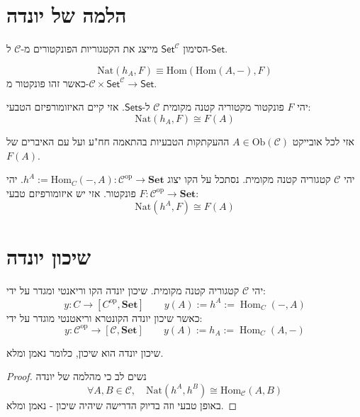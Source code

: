 \documentclass{tstextbook}
\begin{document}
\section{הלמה של יונדה}

\begin{reminder}
הסימון \(\mathsf{Set}^{\mathcal{C}}\) מייצג את הקטגוריות הפונקטורים מ-\(\mathcal{C}\) ל-\(\mathsf{Set}\).

\end{reminder}
\begin{definition}
$$\mathrm{{Nat}}(h_{A},F)\equiv\mathrm{{Hom}}(\mathrm{{Hom}}(A,-),F)$$
כאשר זהו פונקטור מ-\(\mathcal{C}\times \mathsf{Set}^{\mathcal{C}}\to\mathsf{Set}\).

\end{definition}
\begin{proposition}
יהי \(F\) פונקטור מקטוריה קטנה מקומית \(\mathcal{C}\) ל-\(\mathsf{Sets}\). אזי קיים האיזומורפיזם הטבעי:
$$\mathrm{Nat}(h_{A},F)\cong F(A)$$

\end{proposition}
אזי לכל אובייקט \(A \in \mathrm{Ob}\left( \mathcal{C} \right)\) ההעקתקות הטבעיות  בהתאמה חח"ע ועל עם האיברים של \(F(A)\).

\begin{proposition}
יהי \(\mathcal{C}\) קטגוריה קטנה מקומית. נסתכל על הקו יצוג \(h^{A}:=\mathrm{Hom}_{C}(-,A):{\mathcal C}^{\mathrm{op}}\to\mathbf{Set}\). יהי \(F: \mathcal{C}^{\mathrm{op}} \to \mathbf{Set}\) פונקטור. אזי יש איזומורפיזם טבעי:
$$\mathrm{Nat}(h^{A},F)\cong F(A)$$

\end{proposition}
\section{שיכון יונדה}

\begin{definition}
יהי \(\mathcal{C}\) קטגוריה קטנה מקומית. שיכון יונדה הקו וריאנטי ומגדר על ידי:
$$y:C\longrightarrow\left[ C^{\mathrm{op}},\mathbf{Set} \right]\qquad y(A):=h^{A}:=\operatorname{Hom}_{C}(-,A)$$
כאשר שיכון יונדה הקונטרא וריאטנטי מוגדר על ידי:
$$y:{\mathcal{C}}^{\mathrm{op}}\longrightarrow\left[ {\mathcal{C}},\mathbf{Set} \right]\qquad y(A):=h_{A}:=\operatorname{Hom}_{C}(A,-)$$

\end{definition}
\begin{proposition}
שיכון יונדה הוא שיכון, כלומר נאמן ומלא. 

\end{proposition}
\begin{proof}
נשים לב כי מהלמה של יונדה
$$\forall A,B\in{\mathcal{C}},\quad\mathrm{{Nat}}(h^{A},h^{B})\cong\mathrm{Hom}_{{\mathcal{C}}}(A,B)$$
באופן טבעי וזה בדיוק הדרישה שיהיה שיכון - נאמן ומלא.

\end{proof}
\end{document}
